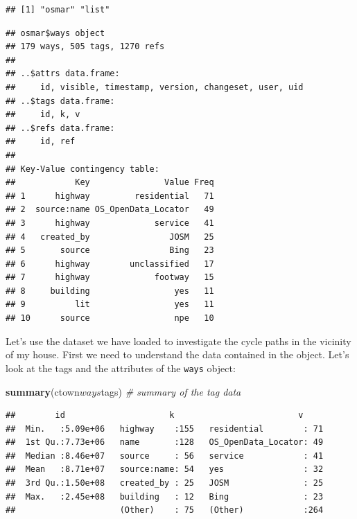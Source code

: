 \documentclass[]{article}
\newenvironment{Shaded}{}{}
\newcommand{\KeywordTok}[1]{\textcolor[rgb]{0.00,0.44,0.13}{\textbf{{#1}}}}
\newcommand{\CommentTok}[1]{\textcolor[rgb]{0.38,0.63,0.69}{\textit{{#1}}}}
\newcommand{\NormalTok}[1]{{#1}}
\begin{document}
\begin{verbatim}
## [1] "osmar" "list"
\end{verbatim}

\begin{Shaded}
\end{Shaded}

\begin{verbatim}
## osmar$ways object
## 179 ways, 505 tags, 1270 refs 
## 
## ..$attrs data.frame: 
##     id, visible, timestamp, version, changeset, user, uid 
## ..$tags data.frame: 
##     id, k, v 
## ..$refs data.frame: 
##     id, ref 
##  
## Key-Value contingency table:
##            Key               Value Freq
## 1      highway         residential   71
## 2  source:name OS_OpenData_Locator   49
## 3      highway             service   41
## 4   created_by                JOSM   25
## 5       source                Bing   23
## 6      highway        unclassified   17
## 7      highway             footway   15
## 8     building                 yes   11
## 9          lit                 yes   11
## 10      source                 npe   10
\end{verbatim}

Let's use the dataset we have loaded to investigate the cycle paths in
the vicinity of my house. First we need to understand the data contained
in the object. Let's look at the tags and the attributes of the
\texttt{ways} object:

\begin{Shaded}
\begin{Highlighting}[]
\KeywordTok{summary}\NormalTok{(ctown$ways$tags)  }\CommentTok{# summary of the tag data}
\end{Highlighting}
\end{Shaded}

\begin{verbatim}
##        id                     k                         v      
##  Min.   :5.09e+06   highway    :155   residential        : 71  
##  1st Qu.:7.73e+06   name       :128   OS_OpenData_Locator: 49  
##  Median :8.46e+07   source     : 56   service            : 41  
##  Mean   :8.71e+07   source:name: 54   yes                : 32  
##  3rd Qu.:1.50e+08   created_by : 25   JOSM               : 25  
##  Max.   :2.45e+08   building   : 12   Bing               : 23  
##                     (Other)    : 75   (Other)            :264
\end{verbatim}
\end{document}
